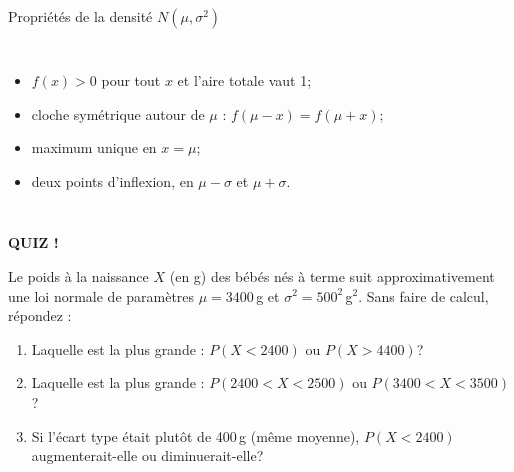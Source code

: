 \documentclass{BeamerTemplate}
\begin{document}
\begin{frame}[t]{Propriétés de la densité $N(\mu, \sigma^2)$}
  \begin{columns}[T]
      \begin{itemize}\itemsep 2mm
        \item $f(x) > 0$ pour tout $x$ et l'aire totale vaut 1;
        \item cloche \alert{symétrique} autour de $\mu$ :
          $f(\mu - x) = f(\mu + x)$;
        \item maximum unique en $x = \mu$;
        \item deux points d'inflexion, en $\mu - \sigma$ et $\mu + \sigma$.
      \end{itemize}
  \end{columns}

  \medskip
\end{frame}

\begin{frame}[plain,t]
  \centerline{\LARGE\bfseries\alert{QUIZ !}}

  \medskip
  Le poids à la naissance $X$ (en g) des bébés nés à terme suit
  approximativement une loi normale de paramètres $\mu = 3400$\,g et
  $\sigma^2 = 500^2$\,g$^2$. Sans faire de calcul, répondez :
  \begin{enumerate}\itemsep 1cm
    \item Laquelle est la plus grande : $P(X < 2400)$ ou $P(X > 4400)$?
    \item Laquelle est la plus grande : $P(2400 < X < 2500)$ ou
      $P(3400 < X < 3500)$?
    \item Si l'écart type était plutôt de 400\,g (même moyenne),
      $P(X < 2400)$ augmenterait-elle ou diminuerait-elle?
  \end{enumerate}
\end{frame}
\end{document}
